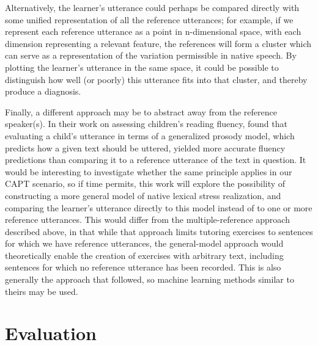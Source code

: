 	Alternatively, the learner's utterance could perhaps be compared directly with some unified representation of all the reference utterances; for example, if we represent each reference utterance as a point in n-dimensional space, with each dimension representing a relevant feature, the references will form a cluster which can serve as a representation of the variation permissible in native speech. By plotting the learner's utterance in the same space, it could be possible to distinguish how well (or poorly) this utterance fits into that cluster, and thereby produce a diagnosis.

	
	Finally, a different approach may be to abstract away from the reference speaker(s). In their work on assessing children's reading fluency, \textcite{Duong2011} found that evaluating a child's utterance in terms of a generalized prosody model, which predicts how a given text should be uttered, yielded more accurate fluency predictions than comparing it to a reference utterance of the text in question. It would be interesting to investigate whether the same principle applies in our CAPT scenario, so if time permits, this work will explore the possibility of constructing a more general model of native lexical stress realization, and comparing the learner's utterance directly to this model instead of to one or more reference utterances. This would differ from the multiple-reference approach described 
above,
in that while that approach limits tutoring exercises to sentences for which we have reference utterances, the general-model approach would theoretically enable the creation of exercises with arbitrary text, including sentences for which no reference utterance has been recorded. This is also generally the approach that \textcite{Shahin2012a,Kim2011} followed, so machine learning methods similar to theirs may be used.

\section{Evaluation}
\label{sec:diag:eval}



